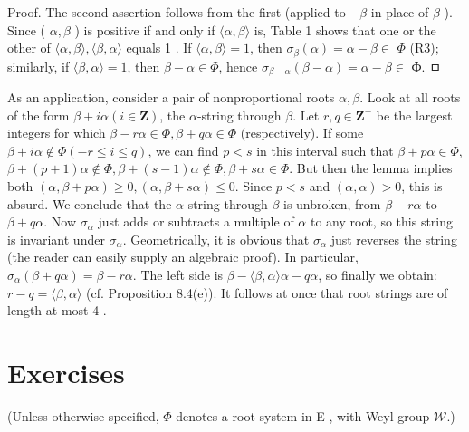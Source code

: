\documentclass[10pt]{article}
\begin{document}
Proof. The second assertion follows from the first (applied to $-\beta$ in place of $\beta$ ). Since ( $\alpha, \beta$ ) is positive if and only if $\langle\alpha, \beta\rangle$ is, Table 1 shows that one or the other of $\langle\alpha, \beta\rangle,\langle\beta, \alpha\rangle$ equals 1 . If $\langle\alpha, \beta\rangle=1$, then $\sigma_{\beta}(\alpha)=\alpha-\beta \in$ $\Phi$ (R3); similarly, if $\langle\beta, \alpha\rangle=1$, then $\beta-\alpha \in \Phi$, hence $\sigma_{\beta-\alpha}(\beta-\alpha)=\alpha-\beta \in$ Ф. ㅁ

As an application, consider a pair of nonproportional roots $\alpha, \beta$. Look at all roots of the form $\beta+i \alpha(i \in \mathbf{Z})$, the $\alpha$-string through $\beta$. Let $r, q \in \mathbf{Z}^{+}$ be the largest integers for which $\beta-r \alpha \in \Phi, \beta+q \alpha \in \Phi$ (respectively). If some $\beta+i \alpha \notin \Phi(-r \leq i \leq q)$, we can find $p<s$ in this interval such that $\beta+p \alpha \in \Phi$, $\beta+(p+1) \alpha \notin \Phi, \beta+(s-1) \alpha \notin \Phi, \beta+s \alpha \in \Phi$. But then the lemma implies both $(\alpha, \beta+p \alpha) \geq 0,(\alpha, \beta+s \alpha) \leq 0$. Since $p<s$ and $(\alpha, \alpha)>0$, this is absurd. We conclude that the $\alpha$-string through $\beta$ is unbroken, from $\beta-r \alpha$ to $\beta+q \alpha$. Now $\sigma_{\alpha}$ just adds or subtracts a multiple of $\alpha$ to any root, so this string is invariant under $\sigma_{\alpha}$. Geometrically, it is obvious that $\sigma_{\alpha}$ just reverses the string (the reader can easily supply an algebraic proof). In particular, $\sigma_{\alpha}(\beta+q \alpha)=\beta-r \alpha$. The left side is $\beta-\langle\beta, \alpha\rangle \alpha-q \alpha$, so finally we obtain: $r-q=\langle\beta, \alpha\rangle$ (cf. Proposition 8.4(e)). It follows at once that root strings are of length at most 4 .

\section*{Exercises}
(Unless otherwise specified, $\Phi$ denotes a root system in E , with Weyl group $\mathscr{W}$.)
\end{document}
